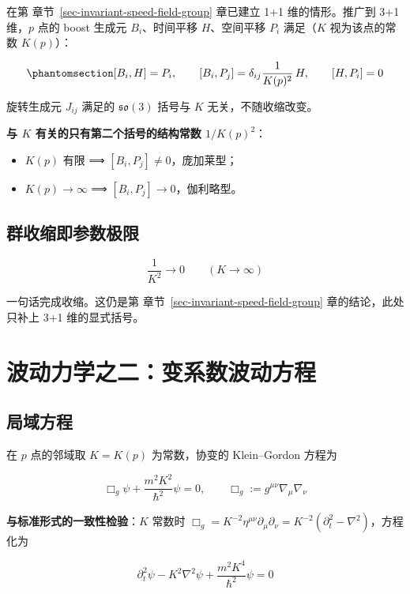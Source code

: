 \documentclass[
  chinese,
  a4paper,
  UTF8,
  12pt,
  oneside,
  openany]{ctexbook}
\providecommand{\tightlist}{%
  \setlength{\itemsep}{0pt}\setlength{\parskip}{0pt}}
\theoremstyle{plain}
\theoremstyle{plain}
\theoremstyle{plain}
\theoremstyle{definition}
\theoremstyle{plain}
\theoremstyle{plain}
\theoremstyle{remark}
\begin{document}
在第 章节~\ref{sec-invariant-speed-field-group} 章已建立 1+1
维的情形。推广到 3+1 维，\(p\) 点的 boost 生成元 \(B_i\)、时间平移
\(H\)、空间平移 \(P_i\) 满足（\(K\) 视为该点的常数 \(K(p)\)）：

\begin{equation}\protect\phantomsection\label{eq-isd-lie}{
[B_i,H]=P_i,\qquad [B_i,P_j]=\delta_{ij}\frac{1}{K(p)^{2}}\,H,\qquad [H,P_i]=0
}\end{equation}

旋转生成元 \(J_{ij}\) 满足的 \(\mathfrak{so}(3)\) 括号与 \(K\)
无关，不随收缩改变。

\textbf{与 \(K\) 有关的只有第二个括号的结构常数 \(1/K(p)^{2}\)}：

\begin{itemize}
\tightlist
\item
  \(K(p)\) 有限 ⟹ \([B_i,P_j]\neq0\)，庞加莱型；
\item
  \(K(p)\to\infty\) ⟹ \([B_i,P_j]\to0\)，伽利略型。
\end{itemize}

\subsection{群收缩即参数极限}\label{ux7fa4ux6536ux7f29ux5373ux53c2ux6570ux6781ux9650}

\[
\frac{1}{K^{2}}\longrightarrow0\qquad (K\to\infty)
\]

一句话完成收缩。这仍是第 章节~\ref{sec-invariant-speed-field-group}
章的结论，此处只补上 3+1 维的显式括号。

\section{波动力学之二：变系数波动方程}\label{sec-isd-wave}

\subsection{局域方程}\label{ux5c40ux57dfux65b9ux7a0b}

在 \(p\) 点的邻域取 \(K=K(p)\) 为常数，协变的 Klein--Gordon 方程为

\[
\Box_g\psi+\frac{m^{2}K^{2}}{\hbar^{2}}\psi=0,\qquad
\Box_g:=g^{\mu\nu}\nabla_\mu\nabla_\nu
\]

\textbf{与标准形式的一致性检验}：\(K\) 常数时
\(\Box_g=K^{-2}\eta^{\mu\nu}\partial_\mu\partial_\nu=K^{-2}(\partial_t^{2}-\nabla^{2})\)，方程化为

\[
\partial_t^{2}\psi-K^{2}\nabla^{2}\psi+\frac{m^{2}K^{4}}{\hbar^{2}}\psi=0
\]
\end{document}
